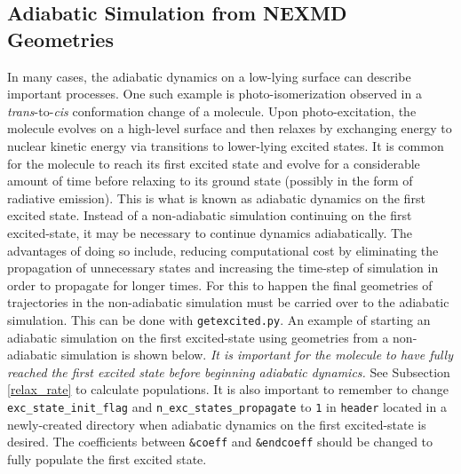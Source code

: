 \documentclass[letterpaper,12pt,titlepage]{article}
\begin{document}
\subsection{Adiabatic Simulation from NEXMD Geometries}
In many cases, the adiabatic dynamics on a low-lying surface can describe important processes. One such example is photo-isomerization observed in a \textit{trans}-to-\textit{cis} conformation change of a molecule.  Upon photo-excitation, the molecule evolves on a high-level surface and then relaxes by exchanging energy to nuclear kinetic energy via transitions to lower-lying excited states.  It is common for the molecule to reach its first excited state and evolve for a considerable amount of time before relaxing to its ground state (possibly in the form of radiative emission).  This is what is known as adiabatic dynamics on the first excited state.  Instead of a non-adiabatic simulation continuing on the first excited-state, it may be necessary to continue dynamics adiabatically.  The advantages of doing so include, reducing computational cost by eliminating the propagation of unnecessary states and increasing the time-step of simulation in order to propagate for longer times.  For this to happen the final geometries of trajectories in the non-adiabatic simulation must be carried over to the adiabatic simulation.  This can be done with \verb+getexcited.py+.  An example of starting an adiabatic simulation on the first excited-state using geometries from a non-adiabatic simulation is shown below.  \textit{It is important for the molecule to have fully reached the first excited state before beginning adiabatic dynamics.}  See Subsection \ref{relax_rate} to calculate populations.  It is also important to remember to change \verb+exc_state_init_flag+ and \verb+n_exc_states_propagate+ to \verb+1+ in \verb+header+ located in a newly-created directory when adiabatic dynamics on the first excited-state is desired.  The coefficients between \verb+&coeff+ and \verb+&endcoeff+ should be changed to fully populate the first excited state.
\end{document}
